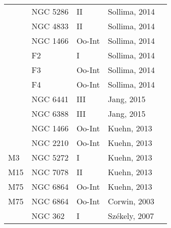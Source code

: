 \documentclass[]{article}
\begin{document}
\begin{longtable}{
	p{1.5cm}|
	p{2.5cm}|
	p{2.5cm}|
	p{3.7cm}|
	p{5.5cm}
	@{}}
		& NGC 5286     & II         & Sollima, 2014        &                                                                        \\
		& NGC 4833     & II         & Sollima, 2014        &                                                                        \\
		& NGC 1466     & Oo-Int     & Sollima, 2014        &                                                                        \\
		& F2           & I          & Sollima, 2014        &                                                                        \\
		& F3           & Oo-Int     & Sollima, 2014        &                                                                        \\
		& F4           & Oo-Int     & Sollima, 2014        &                                                                        \\
		& NGC 6441     & III        & Jang, 2015 \cite{jang_2015}           &                                                                        \\
		& NGC 6388     & III        & Jang, 2015           &                                                                        \\
		& NGC 1466     & Oo-Int     & Kuehn, 2013 \cite{kuehn_2013}          &                                                                        \\
		& NGC 2210     & Oo-Int     & Kuehn, 2013          &                                                                        \\
		M3             & NGC 5272     & I          & Kuehn, 2013          &                                                                        \\
		M15            & NGC 7078     & II         & Kuehn, 2013          &                                                                        \\
		M75            & NGC 6864     & Oo-Int     & Kuehn, 2013          &                                                                        \\
		M75            & NGC 6864     & Oo-Int     & Corwin, 2003 \cite{corwin_2003}         &                                                                        \\
		& NGC 362      & I          & Sz\'ekely, 2007 \cite{szekely_2007}       &                                                                        \\

\end{longtable}
\end{document}

